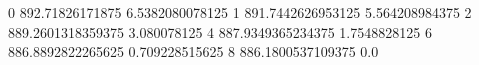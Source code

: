0 892.71826171875 6.5382080078125
1 891.7442626953125 5.564208984375
2 889.2601318359375 3.080078125
4 887.9349365234375 1.7548828125
6 886.8892822265625 0.709228515625
8 886.1800537109375 0.0
